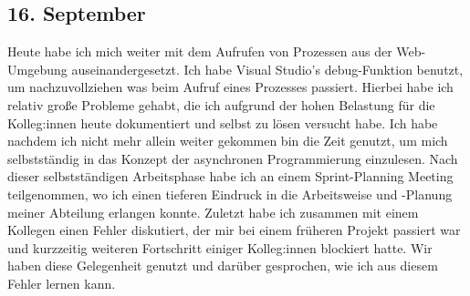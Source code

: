 \subsection{16. September}
Heute habe ich mich weiter mit dem Aufrufen von Prozessen aus der  Web-Umgebung auseinandergesetzt. Ich habe Visual Studio's debug-Funktion benutzt, um nachzuvollziehen was beim Aufruf eines Prozesses passiert. Hierbei habe ich relativ große Probleme gehabt, die ich aufgrund der hohen Belastung für die Kolleg:innen heute dokumentiert und selbst zu lösen versucht habe. Ich habe nachdem ich nicht mehr allein weiter gekommen bin die Zeit genutzt, um mich selbstständig in das Konzept der asynchronen Programmierung einzulesen. Nach dieser selbstständigen Arbeitsphase habe ich an einem Sprint-Planning Meeting teilgenommen, wo ich einen tieferen Eindruck in die Arbeitsweise und -Planung meiner Abteilung erlangen konnte. Zuletzt habe ich zusammen mit einem Kollegen einen Fehler diskutiert, der mir bei einem früheren Projekt passiert war und kurzzeitig weiteren Fortschritt einiger Kolleg:innen blockiert hatte. Wir haben diese Gelegenheit genutzt und darüber gesprochen, wie ich aus diesem Fehler lernen kann.
